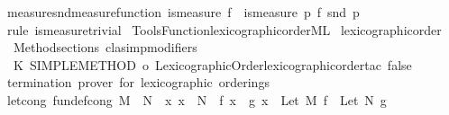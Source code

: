 \begin{isabellebody}
\endisatagproof
{\isafoldproof}%
%
\isadelimproof
\isanewline
%
\endisadelimproof
\isanewline
{}\isamarkupfalse%
\ measure{\isacharunderscore}{\kern0pt}snd{\isacharbrackleft}{\kern0pt}measure{\isacharunderscore}{\kern0pt}function{\isacharbrackright}{\kern0pt}{\isacharcolon}{\kern0pt}\ {\isachardoublequoteopen}is{\isacharunderscore}{\kern0pt}measure\ f\ {\isasymLongrightarrow}\ is{\isacharunderscore}{\kern0pt}measure\ {\isacharparenleft}{\kern0pt}{\isasymlambda}p{\isachardot}{\kern0pt}\ f\ {\isacharparenleft}{\kern0pt}snd\ p{\isacharparenright}{\kern0pt}{\isacharparenright}{\kern0pt}{\isachardoublequoteclose}\isanewline
%
\isadelimproof
\ \ %
\endisadelimproof
%
\isatagproof
{}\isamarkupfalse%
\ {\isacharparenleft}{\kern0pt}rule\ is{\isacharunderscore}{\kern0pt}measure{\isacharunderscore}{\kern0pt}trivial{\isacharparenright}{\kern0pt}%
\endisatagproof
{\isafoldproof}%
%
\isadelimproof
\isanewline
%
\endisadelimproof
%
\isadelimML
\isanewline
%
\endisadelimML
%
\isatagML
{}\isamarkupfalse%
\ {\isacartoucheopen}Tools{\isacharslash}{\kern0pt}Function{\isacharslash}{\kern0pt}lexicographic{\isacharunderscore}{\kern0pt}order{\isachardot}{\kern0pt}ML{\isacartoucheclose}\isanewline
\isanewline
{}\isamarkupfalse%
\ lexicographic{\isacharunderscore}{\kern0pt}order\ {\isacharequal}{\kern0pt}\ {\isacartoucheopen}\isanewline
\ \ Method{\isachardot}{\kern0pt}sections\ clasimp{\isacharunderscore}{\kern0pt}modifiers\ {\isachargreater}{\kern0pt}{\isachargreater}{\kern0pt}\isanewline
\ \ {\isacharparenleft}{\kern0pt}K\ {\isacharparenleft}{\kern0pt}SIMPLE{\isacharunderscore}{\kern0pt}METHOD\ o\ Lexicographic{\isacharunderscore}{\kern0pt}Order{\isachardot}{\kern0pt}lexicographic{\isacharunderscore}{\kern0pt}order{\isacharunderscore}{\kern0pt}tac\ false{\isacharparenright}{\kern0pt}{\isacharparenright}{\kern0pt}\isanewline
{\isacartoucheclose}\ {\isachardoublequoteopen}termination\ prover\ for\ lexicographic\ orderings{\isachardoublequoteclose}%
\endisatagML
{\isafoldML}%
%
\isadelimML
%
\endisadelimML
%
\isadelimdocument
%
\endisadelimdocument
%
\isatagdocument
%
\isamarkuptrue%
%
\endisatagdocument
{\isafolddocument}%
%
\isadelimdocument
%
\endisadelimdocument
{}\isamarkupfalse%
\ let{\isacharunderscore}{\kern0pt}cong\ {\isacharbrackleft}{\kern0pt}fundef{\isacharunderscore}{\kern0pt}cong{\isacharbrackright}{\kern0pt}{\isacharcolon}{\kern0pt}\ {\isachardoublequoteopen}M\ {\isacharequal}{\kern0pt}\ N\ {\isasymLongrightarrow}\ {\isacharparenleft}{\kern0pt}{\isasymAnd}x{\isachardot}{\kern0pt}\ x\ {\isacharequal}{\kern0pt}\ N\ {\isasymLongrightarrow}\ f\ x\ {\isacharequal}{\kern0pt}\ g\ x{\isacharparenright}{\kern0pt}\ {\isasymLongrightarrow}\ Let\ M\ f\ {\isacharequal}{\kern0pt}\ Let\ N\ g{\isachardoublequoteclose}\isanewline

\end{isabellebody}
